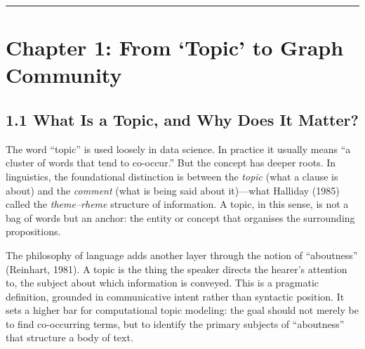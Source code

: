 \documentclass[11pt]{article}
\begin{document}
\begin{abstract}
When compared to the EPRS ground truth, the pipeline's topics align well: all six of the EPRS's recurring themes are recovered (100\% coverage, mean best-match similarity $0.444$), with the largest communities capturing the dominant themes (Ukraine, energy, EU unity) and the smallest isolating the national policy debates that the EPRS records as secondary. Benchmarked against a classical Latent Dirichlet Allocation (LDA) model trained on the identical corpus and scored on the same metric, the graph pipeline is both more complete (LDA recovers only 5 of 6 themes at matched granularity) and more precisely aligned (mean similarity $0.444$ vs.\ LDA's $0.351$). The subtopic similarity distribution is unimodal and centred near $\mu \approx 0.47$, reflecting a corpus that is unified in subject but genuinely differentiated in sub-themes. A persistently negative entity silhouette ($-0.26$ at the community level) shows that these communities are \emph{structurally} rather than \emph{semantically} separated---an honest signature of a discourse in which every leader speaks about the same crises in overlapping language. These results suggest that graph-based community detection offers a promising direction for topic modeling in political discourse, particularly in corpora where standard probabilistic methods struggle with thematic overlap.
\end{abstract}

\hrule

\section{Chapter 1: From `Topic' to Graph Community}

\subsection{1.1 What Is a Topic, and Why Does It Matter?}

The word ``topic'' is used loosely in data science. In practice it usually means ``a cluster of words that tend to co-occur.'' But the concept has deeper roots. In linguistics, the foundational distinction is between the \emph{topic} (what a clause is about) and the \emph{comment} (what is being said about it)---what Halliday (1985) called the \emph{theme--rheme} structure of information. A topic, in this sense, is not a bag of words but an anchor: the entity or concept that organises the surrounding propositions.

The philosophy of language adds another layer through the notion of ``aboutness'' (Reinhart, 1981). A topic is the thing the speaker directs the hearer's attention to, the subject about which information is conveyed. This is a pragmatic definition, grounded in communicative intent rather than syntactic position. It sets a higher bar for computational topic modeling: the goal should not merely be to find co-occurring terms, but to identify the primary subjects of ``aboutness'' that structure a body of text.
\end{document}

